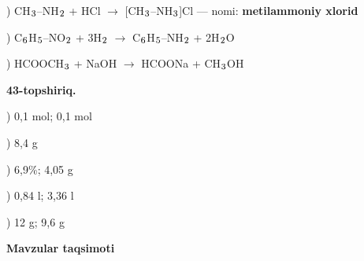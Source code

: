\documentclass[11pt,a4paper]{article}
\renewcommand{\textsubscript}[1]{\ensuremath{_{\text{\fontsize{8}{8}\selectfont #1}}}}
\begin{document}
) CH\textsubscript{3}--NH\textsubscript{2} + HCl $\to$ [CH\textsubscript{3}--NH\textsubscript{3}]Cl --- nomi: \textbf{metilammoniy xlorid}\par
{}) C\textsubscript{6}H\textsubscript{5}--NO\textsubscript{2} + 3H\textsubscript{2} $\to$ C\textsubscript{6}H\textsubscript{5}--NH\textsubscript{2} + 2H\textsubscript{2}O\par
{}) HCOOCH\textsubscript{3} + NaOH $\to$ HCOONa + CH\textsubscript{3}OH\par
\noindent\textbf{43-topshiriq.}\par
{}) 0,1 mol; 0,1 mol\par
{}) 8,4 g\par
{}) 6,9\%; 4,05 g\par
{}) 0,84 l; 3,36 l\par
{}) 12 g; 9,6 g\par
\par\bigskip\noindent\textbf{Mavzular taqsimoti}\par\smallskip
\end{document}
